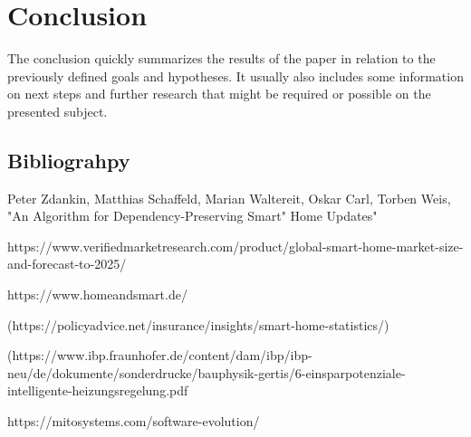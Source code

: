 \chapter{Conclusion}

The conclusion quickly summarizes the results of the paper
in relation to the previously defined goals and hypotheses.
It usually also includes some information on next steps and further research
that might be required or possible on the presented subject.



\section{Bibliograhpy}

\begin{thebibliography}{9}

Peter Zdankin, Matthias Schaffeld, Marian Waltereit, Oskar Carl, Torben Weis, "An Algorithm for Dependency-Preserving Smart"
Home Updates"

https://www.verifiedmarketresearch.com/product/global-smart-home-market-size-and-forecast-to-2025/

https://www.homeandsmart.de/



(https://policyadvice.net/insurance/insights/smart-home-statistics/)

(https://www.ibp.fraunhofer.de/content/dam/ibp/ibp-neu/de/dokumente/sonderdrucke/bauphysik-gertis/6-einsparpotenziale-intelligente-heizungsregelung.pdf

https://mitosystems.com/software-evolution/

\end{thebibliography}


